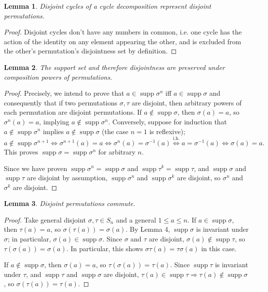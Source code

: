 \documentclass{article}
\DeclareMathOperator{\supp}{supp}
\newtheorem{lemma}{Lemma}
\begin{document}
\begin{lemma}
  Disjoint cycles of a cycle decomposition represent disjoint permutations.
\end{lemma}
\begin{proof}
  Disjoint cycles don't have any numbers in common, i.e. one cycle has the action of the identity on any element appearing the other,
  and is excluded from the other's permutation's disjointness set by definition.
\end{proof}
\begin{lemma}
  The support set and therefore disjointness are preserved under composition powers of permutations.
\end{lemma}
\begin{proof}
  Precisely, we intend to prove that $a\in \supp \sigma^{n}$ iff $a\in \supp \sigma$ and consequently that if two permutations $\sigma,\tau$ are disjoint,
  then arbitrary powers of each permutation are disjoint permutations.
  If $a\not\in \supp \sigma$, then $\sigma(a)=a$, so $\sigma^{n}(a)=a$, implying $a\not\in\supp\sigma^{n}$.
  Conversely, suppose for induction that $a\not\in\supp\sigma^{n}$ implies $a\not\in\supp\sigma$ (the case $n=1$ is reflexive);
  \[
    a\not\in\supp\sigma^{n+1} \Leftrightarrow \sigma^{n+1}(a)=a\Leftrightarrow \sigma^{n}(a) = \sigma^{-1}(a)
    \overset{\text{i.h.}}{\Leftrightarrow}a=\sigma^{-1}(a) \Leftrightarrow \sigma(a) = a.
  \]
  This proves $\supp \sigma = \supp \sigma^{n}$ for arbitrary $n$.

  Since we have proven $\supp \sigma^{n}=\supp \sigma$ and $\supp \tau^{k} = \supp \tau$, and $\supp\sigma$ and $\supp\tau$ are disjoint by assumption,
  $\supp\sigma^{n}$ and $\supp\sigma^{k}$ are disjoint, so $\sigma^{n}$ and $\sigma^{k}$ are disjoint.
\end{proof}
\begin{lemma}
  Disjoint permutations commute.
\end{lemma}
\begin{proof}
  Take general disjoint $\sigma,\tau\in S_{n}$ and a general $1\leq a\leq n$.
  If $a\in \supp{\sigma}$, then $\tau(a) = a$, so $\sigma(\tau(a)) = \sigma(a)$.
  By Lemma 4, $\supp{\sigma}$ is invariant under $\sigma$; in particular, $\sigma(a)\in \supp{\sigma}$.
  Since $\sigma$ and $\tau$ are disjoint, $\sigma(a)\not\in\supp\tau$, so $\tau(\sigma(a)) = \sigma(a)$.
  In particular, this shows $\sigma\tau(a) = \tau\sigma(a)$ in this case.

  If $a\not\in \supp{\sigma}$, then $\sigma(a) = a$, so $\tau(\sigma(a))=\tau(a)$.
  Since $\supp{\tau}$ is invariant under $\tau$, and $\supp {\tau}$ and $\supp{\sigma}$ are disjoint,
  $\tau(a)\in \supp{\tau}\Rightarrow \tau(a)\not\in \supp{\sigma}$, so $\sigma(\tau(a)) = \tau(a)$.
\end{proof}
\end{document}
